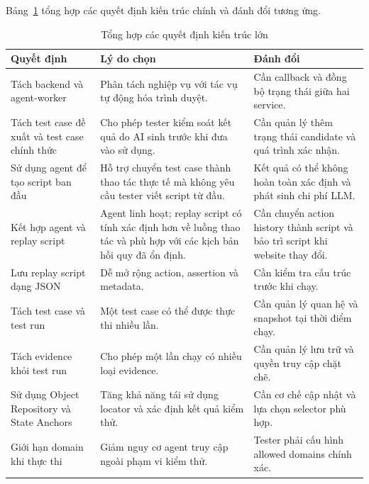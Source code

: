 Bảng~\ref{tab:chapter4_design_decisions} tổng hợp các quyết định kiến trúc chính và đánh đổi tương ứng.

\begin{table}[H]
\centering
\caption{Tổng hợp các quyết định kiến trúc lớn}
\label{tab:chapter4_design_decisions}
\renewcommand{\arraystretch}{1.2}
\begin{tabular}{|p{4.0cm}|p{5.2cm}|p{5.0cm}|}
\hline
\textbf{Quyết định} &
\textbf{Lý do chọn} &
\textbf{Đánh đổi} \\
\hline

Tách backend và agent-worker &
Phân tách nghiệp vụ với tác vụ tự động hóa trình duyệt. &
Cần callback và đồng bộ trạng thái giữa hai service. \\
\hline

Tách test case đề xuất và test case chính thức &
Cho phép tester kiểm soát kết quả do AI sinh trước khi đưa vào sử dụng. &
Cần quản lý thêm trạng thái candidate và quá trình xác nhận. \\
\hline

Sử dụng agent để tạo script ban đầu &
Hỗ trợ chuyển test case thành thao tác thực tế mà không yêu cầu tester viết script từ đầu. &
Kết quả có thể không hoàn toàn xác định và phát sinh chi phí LLM. \\
\hline

Kết hợp agent và replay script &
Agent linh hoạt; replay script có tính xác định hơn về luồng thao tác và phù hợp với các kịch bản hồi quy đã ổn định. &
Cần chuyển action history thành script và bảo trì script khi website thay đổi. \\
\hline

Lưu replay script dạng JSON &
Dễ mở rộng action, assertion và metadata. &
Cần kiểm tra cấu trúc trước khi chạy. \\
\hline

Tách test case và test run &
Một test case có thể được thực thi nhiều lần. &
Cần quản lý quan hệ và snapshot tại thời điểm chạy. \\
\hline

Tách evidence khỏi test run &
Cho phép một lần chạy có nhiều loại evidence. &
Cần quản lý lưu trữ và quyền truy cập chặt chẽ. \\
\hline

Sử dụng Object Repository và State Anchors &
Tăng khả năng tái sử dụng locator và xác định kết quả kiểm thử. &
Cần cơ chế cập nhật và lựa chọn selector phù hợp. \\
\hline

Giới hạn domain khi thực thi &
Giảm nguy cơ agent truy cập ngoài phạm vi kiểm thử. &
Tester phải cấu hình allowed domains chính xác. \\
\hline
\end{tabular}
\end{table}

